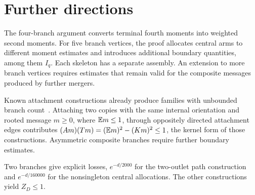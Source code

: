 \section{Further directions}\label{sec:discussion}
The four-branch argument converts terminal fourth moments into weighted
second moments. For five branch vertices, the proof allocates central arms to different
moment estimates and introduces additional boundary quantities, among
them $I_q$. Each skeleton has a separate assembly. An extension
to more branch vertices requires estimates that remain valid for the
composite messages produced by further mergers.

Known attachment constructions already produce families with unbounded
branch count~\cite[Theorem 1.3 and Proposition 5.2]{HMNTW}. Attaching two
copies with the same internal orientation and rooted message $m\ge0$,
where $\mathbb E m\le1$, through oppositely directed attachment edges contributes
$(Am)(Tm)=(\mathbb E m)^2-(Km)^2\le1$, the kernel form of those constructions. Asymmetric composite branches require further boundary estimates.

Two branches give explicit losses, $e^{-d/2000}$ for the two-outlet
path construction and $e^{-d/160000}$ for the nonsingleton central
allocations. The other constructions yield $Z_D\le1$.

